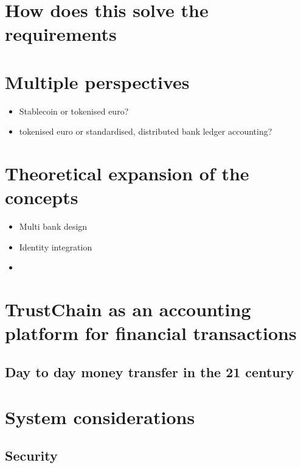 \documentclass[whitelogo]{tudelft-report}
\providecommand{\tightlist}{%
  \setlength{\itemsep}{0pt}\setlength{\parskip}{0pt}}
\begin{document}
\section{How does this solve the
requirements}\label{how-does-this-solve-the-requirements}

\section{Multiple perspectives}\label{multiple-perspectives}

\begin{itemize}
\tightlist
\item
  Stablecoin or tokenised euro?
\item
  tokenised euro or standardised, distributed bank ledger accounting?
\end{itemize}

\section{Theoretical expansion of the
concepts}\label{theoretical-expansion-of-the-concepts}

\begin{itemize}
\item
  Multi bank design
\item
  Identity integration
\item
\end{itemize}

\section{TrustChain as an accounting platform for financial
transactions}\label{trustchain-as-an-accounting-platform-for-financial-transactions}

\subsection{Day to day money transfer in the 21
century}\label{day-to-day-money-transfer-in-the-21-century}

\section{System considerations}\label{system-considerations}

\subsection{Security}\label{security}
\end{document}
